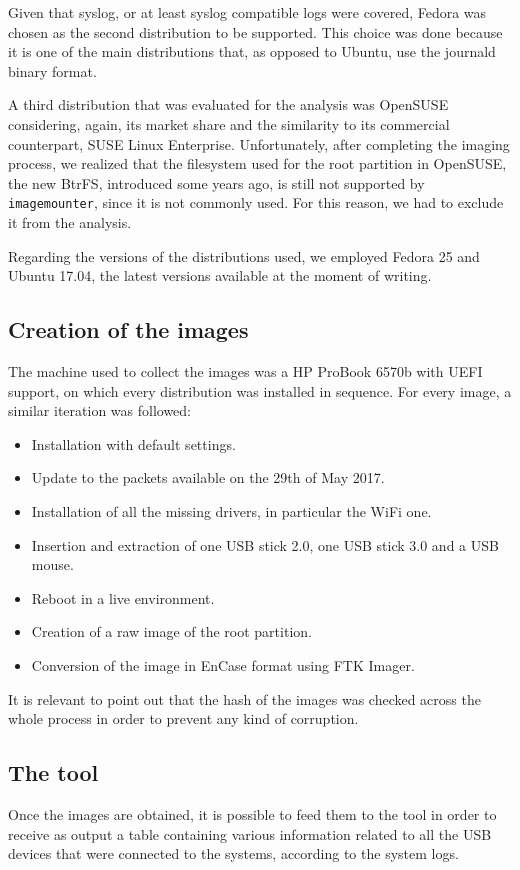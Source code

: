 \documentclass[a4paper]{article}
\begin{document}
Given that syslog, or at least syslog compatible logs were covered, Fedora was
chosen as the second distribution to be supported. This choice was done because
it is one of the main distributions that, as opposed to Ubuntu, use the
journald binary format.

A third distribution that was evaluated for the analysis was OpenSUSE
considering, again, its market share and the similarity to its commercial
counterpart, SUSE Linux Enterprise. Unfortunately, after completing the imaging
process, we realized that the filesystem used for the root partition in
OpenSUSE, the new BtrFS, introduced some years ago, is still not supported by
\texttt{imagemounter}, since it is not commonly used. For this reason, we had to
exclude it from the analysis.

Regarding the versions of the distributions used, we employed Fedora 25 and
Ubuntu 17.04, the latest versions available at the moment of writing.

\subsection{Creation of the images}
\label{sec:images}
The machine used to collect the images was a HP ProBook 6570b with UEFI
support, on which every distribution was installed in sequence. For every
image, a similar iteration was followed:
\begin{itemize}
\item Installation with default settings.
\item Update to the packets available on the 29th of May 2017.
\item Installation of all the missing drivers, in particular the WiFi one.
\item Insertion and extraction of one USB stick 2.0, one USB stick 3.0 and a USB
	mouse.
\item Reboot in a live environment.
\item Creation of a raw image of the root partition.
\item Conversion of the image in EnCase format using FTK Imager.
\end{itemize}
It is relevant to point out that the hash of the images was checked across the
whole process in order to prevent any kind of corruption.

\subsection{The tool}\label{sec:tool}
Once the images are obtained, it is possible to feed them to the tool in order
to receive as output a table containing various information related to all the
USB devices that were connected to the systems, according to the system logs.
\end{document}
